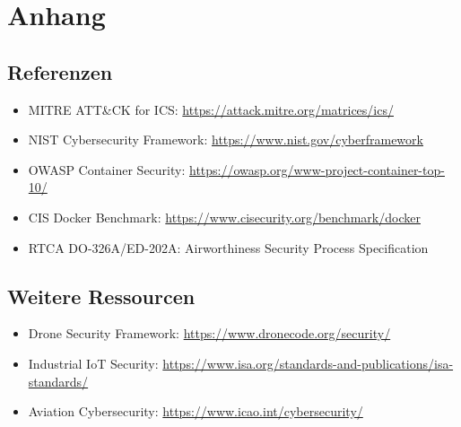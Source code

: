 \documentclass[11pt,a4paper]{article}
\begin{document}
\section{Anhang}

\subsection{Referenzen}

\begin{itemize}[leftmargin=*]
    \item MITRE ATT\&CK for ICS: \url{https://attack.mitre.org/matrices/ics/}
    \item NIST Cybersecurity Framework: \url{https://www.nist.gov/cyberframework}
    \item OWASP Container Security: \url{https://owasp.org/www-project-container-top-10/}
    \item CIS Docker Benchmark: \url{https://www.cisecurity.org/benchmark/docker}
    \item RTCA DO-326A/ED-202A: Airworthiness Security Process Specification
\end{itemize}

\subsection{Weitere Ressourcen}

\begin{itemize}[leftmargin=*]
    \item Drone Security Framework: \url{https://www.dronecode.org/security/}
    \item Industrial IoT Security: \url{https://www.isa.org/standards-and-publications/isa-standards/}
    \item Aviation Cybersecurity: \url{https://www.icao.int/cybersecurity/}
\end{itemize}
\end{document}
